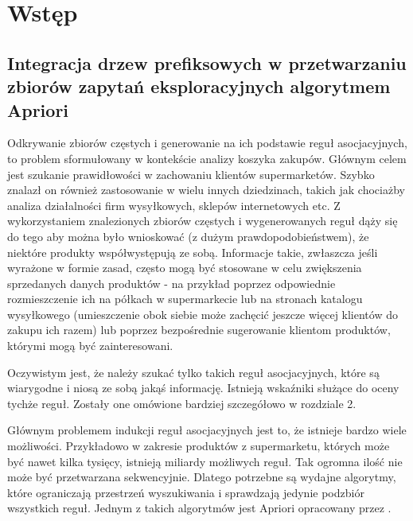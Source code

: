 \chapter{Wstęp}
\label{c1}

\section{Integracja drzew prefiksowych w przetwarzaniu zbiorów zapytań eksploracyjnych algorytmem Apriori}
\label{c11}


Odkrywanie zbiorów częstych i generowanie na ich podstawie reguł asocjacyjnych, to problem sformułowany w kontekście analizy koszyka zakupów. Głównym celem jest szukanie prawidłowości w zachowaniu klientów supermarketów. Szybko znalazł on również zastosowanie w wielu innych dziedzinach, takich jak chociażby analiza działalności firm wysyłkowych, sklepów internetowych etc. Z wykorzystaniem znalezionych zbiorów częstych i wygenerowanych reguł dąży się do tego aby można było wnioskować (z dużym prawdopodobieństwem), że niektóre produkty współwystępują ze sobą. Informacje takie, zwłaszcza jeśli wyrażone w formie zasad, często mogą być stosowane w celu zwiększenia sprzedanych danych produktów - na przykład poprzez odpowiednie rozmieszczenie ich na półkach w supermarkecie lub na stronach katalogu wysyłkowego (umieszczenie obok siebie może zachęcić jeszcze więcej klientów do zakupu ich razem) lub poprzez bezpośrednie sugerowanie klientom produktów, którymi mogą być zainteresowani. 

Oczywistym jest, że należy szukać tylko takich reguł asocjacyjnych, które są wiarygodne i niosą ze sobą jakąś informację. Istnieją wskaźniki służące do oceny tychże reguł. Zostały one omówione bardziej szczegółowo w rozdziale 2. 

Głównym problemem indukcji reguł asocjacyjnych jest to, że istnieje bardzo wiele możliwości. Przykładowo w zakresie produktów z supermarketu, których może być nawet kilka tysięcy, istnieją miliardy możliwych reguł. Tak ogromna ilość nie może być przetwarzana sekwencyjnie. Dlatego potrzebne są wydajne algorytmy, które ograniczają przestrzeń wyszukiwania i sprawdzają jedynie podzbiór wszystkich reguł. Jednym z takich algorytmów jest Apriori opracowany przez \cite{Agrawal}.


